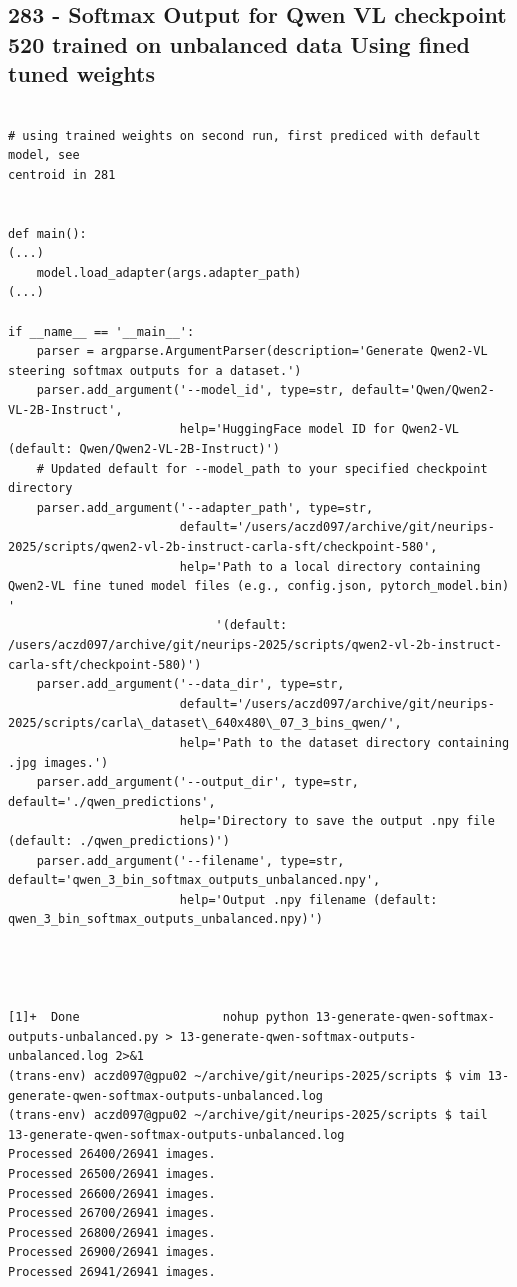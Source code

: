 \subsection{283 - Softmax Output for Qwen VL checkpoint 520 trained on unbalanced data Using fined tuned weights}
\label{app_res:283}

\begin{verbatim}

# using trained weights on second run, first prediced with default model, see
centroid in 281


def main():
(...)
    model.load_adapter(args.adapter_path)
(...)

if __name__ == '__main__':
    parser = argparse.ArgumentParser(description='Generate Qwen2-VL steering softmax outputs for a dataset.')
    parser.add_argument('--model_id', type=str, default='Qwen/Qwen2-VL-2B-Instruct',
                        help='HuggingFace model ID for Qwen2-VL (default: Qwen/Qwen2-VL-2B-Instruct)')
    # Updated default for --model_path to your specified checkpoint directory
    parser.add_argument('--adapter_path', type=str,
                        default='/users/aczd097/archive/git/neurips-2025/scripts/qwen2-vl-2b-instruct-carla-sft/checkpoint-580',
                        help='Path to a local directory containing Qwen2-VL fine tuned model files (e.g., config.json, pytorch_model.bin) '
                             '(default: /users/aczd097/archive/git/neurips-2025/scripts/qwen2-vl-2b-instruct-carla-sft/checkpoint-580)')
    parser.add_argument('--data_dir', type=str,
                        default='/users/aczd097/archive/git/neurips-2025/scripts/carla\_dataset\_640x480\_07_3_bins_qwen/',
                        help='Path to the dataset directory containing .jpg images.')
    parser.add_argument('--output_dir', type=str, default='./qwen_predictions',
                        help='Directory to save the output .npy file (default: ./qwen_predictions)')
    parser.add_argument('--filename', type=str, default='qwen_3_bin_softmax_outputs_unbalanced.npy',
                        help='Output .npy filename (default: qwen_3_bin_softmax_outputs_unbalanced.npy)')




[1]+  Done                    nohup python 13-generate-qwen-softmax-outputs-unbalanced.py > 13-generate-qwen-softmax-outputs-unbalanced.log 2>&1
(trans-env) aczd097@gpu02 ~/archive/git/neurips-2025/scripts $ vim 13-generate-qwen-softmax-outputs-unbalanced.log 
(trans-env) aczd097@gpu02 ~/archive/git/neurips-2025/scripts $ tail 13-generate-qwen-softmax-outputs-unbalanced.log 
Processed 26400/26941 images.
Processed 26500/26941 images.
Processed 26600/26941 images.
Processed 26700/26941 images.
Processed 26800/26941 images.
Processed 26900/26941 images.
Processed 26941/26941 images.


\end{verbatim}

